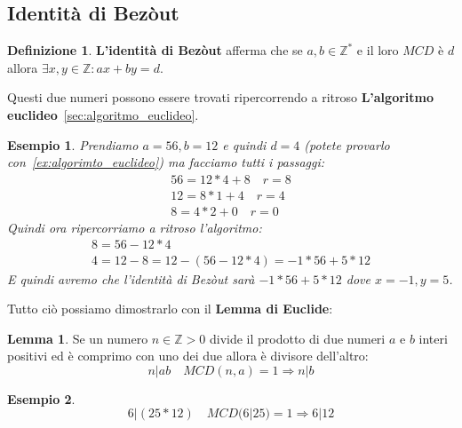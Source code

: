 \documentclass{article}
\newtheorem{exmp}{Esempio}[section]
\theoremstyle{definition}
\newtheorem{definition}{Definizione}[section]
\newtheorem{lemma}{Lemma}[section]
\begin{document}
\subsection{Identità di Bezòut}\label{sec:identita_di_bezout}
\begin{definition}
        \textbf{L'identità di Bezòut} afferma che se $ a,b \in \mathbb{Z}^* $ e il loro $ MCD $ è $ d $ allora $ \exists x,y \in \mathbb{Z} : ax + by = d $. \par
        Questi due numeri possono essere trovati ripercorrendo a ritroso \textbf{L'algoritmo euclideo}~\ref{sec:algoritmo_euclideo}.  
\end{definition}
\begin{exmp}
        Prendiamo $ a = 56, b = 12 $ e quindi $ d = 4 $ (potete provarlo con~\ref{ex:algorimto_euclideo}) ma facciamo tutti i passaggi:
        \begin{align*}
                56 = 12 * 4 + 8 \quad r=8 \\
                12 = 8 * 1 + 4  \quad r=4 \\
                 8 = 4 * 2 + 0  \quad r=0
        \end{align*}
        Quindi ora ripercorriamo a ritroso l'algoritmo:
        \begin{align*}
                8 = 56 - 12 * 4 \\
                4 = 12 - 8 = 12 -(56 - 12 * 4) = -1 * 56 + 5 * 12
        \end{align*}
        E quindi avremo che l'identità di Bezòut sarà $ - 1 * 56 + 5 * 12 $ dove $ x = -1, y = 5 $.  
\end{exmp}
Tutto ciò possiamo dimostrarlo con il \textbf{Lemma di Euclide}:
\begin{tcolorbox}
        
\begin{lemma}
        Se un numero $ n \in \mathbb{Z} > 0 $ divide il prodotto di due numeri $ a $ e $ b $ interi positivi ed è comprimo con uno dei due allora è divisore dell'altro:
        \begin{equation*}
                n | ab \quad MCD(n,a) = 1 \Rightarrow n | b
        \end{equation*}
\end{lemma}
\begin{exmp}
        \begin{equation*}
                6 | (25*12) \quad  MCD(6|25) = 1 \Rightarrow 6|12
        \end{equation*}
\end{exmp}
\end{tcolorbox}
\end{document}
